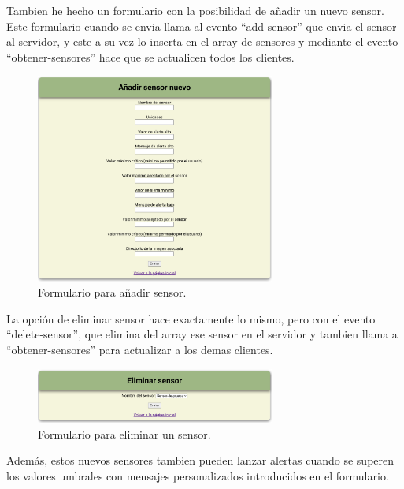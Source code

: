 \documentclass{article}
\begin{document}
Tambien he hecho un formulario con la posibilidad de añadir un nuevo sensor. Este formulario cuando se envia llama al evento ``add-sensor'' que envia el sensor al servidor, y este a su vez lo inserta en el array de sensores y mediante el evento ``obtener-sensores'' hace que se actualicen todos los clientes. 

\begin{figure}[H]
    \centering
    \includegraphics[width=0.7\textwidth]{images/addsensor.png}
    \caption{Formulario para añadir sensor.}
\end{figure}

La opción de eliminar sensor hace exactamente lo mismo, pero con el evento ``delete-sensor'', que elimina del array ese sensor en el servidor y tambien llama a ``obtener-sensores'' para actualizar a los demas clientes.

\begin{figure}[H]
    \centering
    \includegraphics[width=0.7\textwidth]{images/deletesensorform.png}
    \caption{Formulario para eliminar un sensor.}
\end{figure}

Además, estos nuevos sensores tambien pueden lanzar alertas cuando se superen los valores umbrales con mensajes personalizados introducidos en el formulario.
\end{document}
